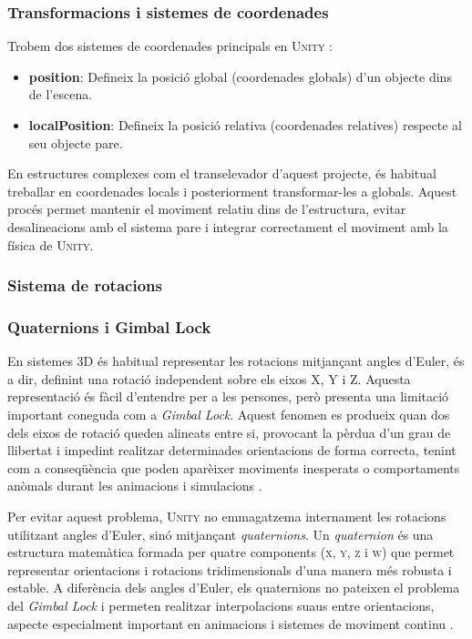 \documentclass[a4paper,11pt,DIV=13,headings=normal,abstract=true,twoside=semi]{article}
\newcommand{\acro}[1]{\textsc{#1}}
\begin{document}
\subsubsection{Transformacions i sistemes de coordenades}

Trobem dos sistemes de coordenades principals en \acro{Unity} \cite{UnityTransformLocalPosition}:
\begin{itemize}
    \item \textbf{position}: Defineix la posició global (coordenades globals) d'un objecte dins de l'escena.
    \item \textbf{localPosition}: Defineix la posició relativa (coordenades relatives) respecte al seu objecte pare. 
\end{itemize}

En estructures complexes com el transelevador d'aquest projecte, és habitual treballar en coordenades locals i posteriorment transformar-les a globals. Aquest procés permet mantenir el moviment relatiu dins de l'estructura, evitar desalineacions amb el sistema pare i integrar correctament el moviment amb la física de \acro{Unity}.

\subsubsection{Sistema de rotacions}
\subsubsection*{Quaternions i Gimbal Lock}

En sistemes 3D és habitual representar les rotacions mitjançant angles d'Euler, és a dir, definint una rotació independent sobre els eixos X, Y i Z. Aquesta representació és fàcil d'entendre per a les persones, però presenta una limitació important coneguda com a \emph{Gimbal Lock}. Aquest fenomen es produeix quan dos dels eixos de rotació queden alineats entre si, provocant la pèrdua d'un grau de llibertat i impedint realitzar determinades orientacions de forma correcta, tenint com a conseqüència que poden aparèixer moviments inesperats o comportaments anòmals durant les animacions i simulacions \cite{UnityQuaternionEuler2019}.

Per evitar aquest problema, \acro{Unity} no emmagatzema internament les rotacions utilitzant angles d'Euler, sinó mitjançant \emph{quaternions}. Un \emph{quaternion} és una estructura matemàtica formada per quatre components (\acro{x}, \acro{y}, \acro{z} i \acro{w}) que permet representar orientacions i rotacions tridimensionals d'una manera més robusta i estable. A diferència dels angles d'Euler, els quaternions no pateixen el problema del \emph{Gimbal Lock} i permeten realitzar interpolacions suaus entre orientacions, aspecte especialment important en animacions i sistemes de moviment continu \cite{UnityQuaternion}.
\end{document}
